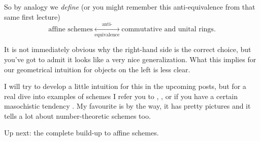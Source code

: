 So by analogy we \emph{define} (or you might remember this anti-equivalence from that same first lecture)
\begin{equation}
  \text{affine schemes} \underset{\text{equivalence}}{\overset{\text{anti-}}{\longleftrightarrow}} \text{commutative and unital rings}.
  \label{equation:scheme-anti-equivalence}
\end{equation}

It is not immediately obvious why the right-hand side is the correct choice, but you've got to admit it looks like a very nice generalization. What this implies for our geometrical intuition for objects on the left is less clear.

I will try to develop a little intuition for this in the upcoming posts, but for a real dive into examples of schemes I refer you to \cite{geometry-of-schemes}, \cite{foag}, \cite{red-book} or if you have a certain masochistic tendency \cite{hartshorne}. My favourite is \cite{foag} by the way, it has pretty pictures and it tells a lot about number-theoretic schemes too.

Up next: the complete build-up to affine schemes.
